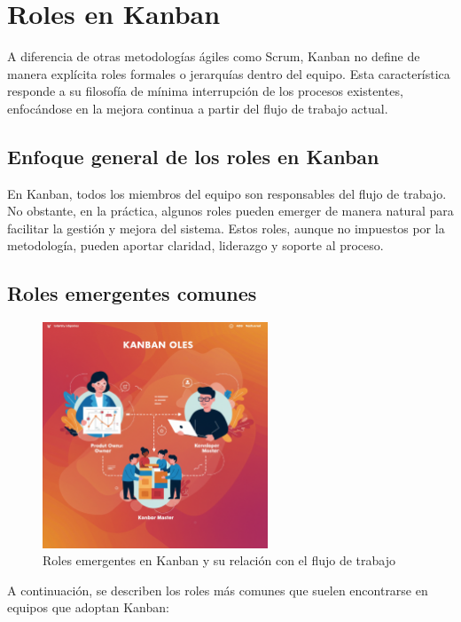 \section{Roles en Kanban}

A diferencia de otras metodologías ágiles como Scrum, Kanban no define de manera explícita roles formales o jerarquías dentro del equipo. Esta característica responde a su filosofía de mínima interrupción de los procesos existentes, enfocándose en la mejora continua a partir del flujo de trabajo actual.

\subsection{Enfoque general de los roles en Kanban}

En Kanban, todos los miembros del equipo son responsables del flujo de trabajo. No obstante, en la práctica, algunos roles pueden emerger de manera natural para facilitar la gestión y mejora del sistema. Estos roles, aunque no impuestos por la metodología, pueden aportar claridad, liderazgo y soporte al proceso.

\subsection{Roles emergentes comunes}
\begin{figure}[H]
    \centering
    \includegraphics[width=0.6\textwidth]{assets/images/roles-kanban.png}
    \caption{Roles emergentes en Kanban y su relación con el flujo de trabajo}
    \label{fig:roles-kanban}
\end{figure}

A continuación, se describen los roles más comunes que suelen encontrarse en equipos que adoptan Kanban:

